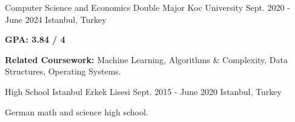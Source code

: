 
\begin{cventries}
  \cventry
    {Computer Science and Economics Double Major}
    {Koc University}
    {Sept. 2020 - June 2024}
    {Istanbul, Turkey}
    {
      \begin{cvitems}
      \item {\textbf{GPA: 3.84 / 4}}
      \item {\textbf{Related Coursework:} Machine Learning, Algorithms \& Complexity, Data Structures, Operating Systems.}
      \end{cvitems}
    }

  \cventry
    {High School}
    {Istanbul Erkek Lisesi}
    {Sept. 2015 - June 2020}
    {Istanbul, Turkey}
    {
      \begin{cvitems}
      \item {German math and science high school.}
      \end{cvitems}
    }

\end{cventries}
